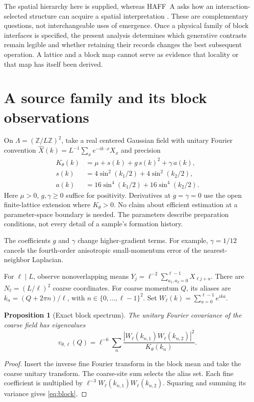 \documentclass[12pt,a4paper]{article}
\newtheorem{proposition}[theorem]{Proposition}
\begin{document}
The spatial hierarchy here is supplied, whereas HAFF~A asks how an
interaction-selected structure can acquire a spatial interpretation
\cite{HAFFA}. These are complementary questions, not interchangeable
uses of emergence. Once a physical family of block interfaces is
specified, the present analysis determines which generative contrasts
remain legible and whether retaining their records changes the best
subsequent operation. A lattice and a block map cannot serve as evidence
that locality or that map has itself been derived.


\section{A source family and its block observations}

On $\Lambda=(\mathbb Z/L\mathbb Z)^2$, take a real centered Gaussian
field with unitary Fourier convention
$\widehat X(k)=L^{-1}\sum_x e^{-ik\cdot x}X_x$ and precision
\begin{align}
 K_\theta(k)&=\mu+s(k)+g\,s(k)^2+\gamma\,a(k),\label{eq:K}\\
 s(k)&=4\sin^2(k_1/2)+4\sin^2(k_2/2),\nonumber\\
 a(k)&=16\sin^4(k_1/2)+16\sin^4(k_2/2).\nonumber
\end{align}
Here $\mu>0$, $g,\gamma\geq0$ suffice for positivity. Derivatives at
$g=\gamma=0$ use the open finite-lattice extension where $K_\theta>0$.
No claim about efficient estimation at a parameter-space boundary is
needed. The parameters describe preparation conditions, not every
detail of a sample's formation history.

The coefficients $g$ and $\gamma$ change higher-gradient terms.
For example, $\gamma=1/12$ cancels the fourth-order anisotropic
small-momentum error of the nearest-neighbor Laplacian.

For $\ell\mid L$, observe nonoverlapping means
$Y_j=\ell^{-2}\sum_{a_1,a_2=0}^{\ell-1}X_{\ell j+a}$.
There are $N_\ell=(L/\ell)^2$ coarse coordinates. For coarse momentum
$Q$, its aliases are $k_n=(Q+2\pi n)/\ell$, with
$n\in\{0,\ldots,\ell-1\}^2$. Set
$W_\ell(k)=\sum_{a=0}^{\ell-1}e^{ika}$.

\begin{proposition}[Exact block spectrum]\label{prop:block}
The unitary Fourier covariance of the coarse field has eigenvalues
\begin{equation}
 v_{\theta,\ell}(Q)=\ell^{-6}\sum_n
 \frac{|W_\ell(k_{n,1})W_\ell(k_{n,2})|^2}{K_\theta(k_n)}.
 \label{eq:block}
\end{equation}
\end{proposition}
\begin{proof}
Insert the inverse fine Fourier transform in the block mean and take
the coarse unitary transform. The coarse-site sum selects the alias
set. Each fine coefficient is multiplied by
$\ell^{-3}W_\ell(k_{n,1})W_\ell(k_{n,2})$. Squaring and summing its
variance gives \eqref{eq:block}.
\end{proof}
\end{document}
